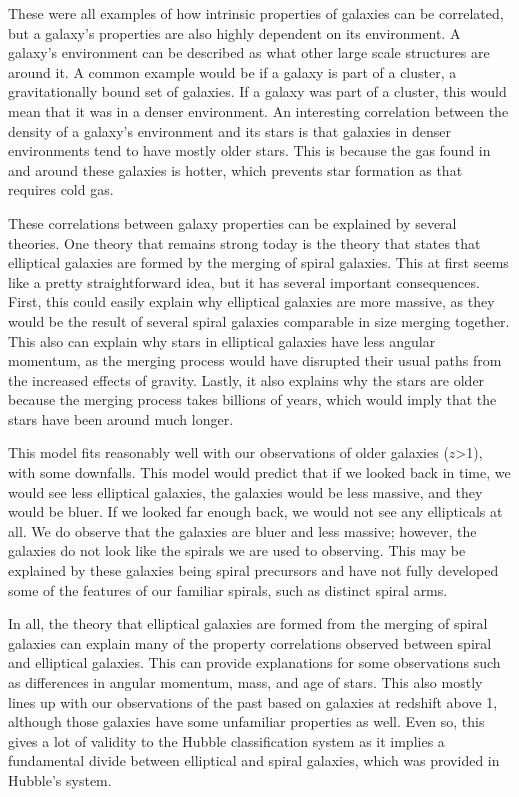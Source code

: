 \documentclass[12pt]{article}
\begin{document}
These were all examples of how intrinsic properties of galaxies can be
correlated, but a galaxy's properties are also highly dependent on its
environment.  A galaxy's environment can be described as what other large scale
structures are around it.  A common example would be if a galaxy is part of a
cluster, a gravitationally bound set of galaxies.  If a galaxy was part of a
cluster, this would mean that it was in a denser environment.  An interesting
correlation between the density of a galaxy's environment and its stars is that
galaxies in denser environments tend to have mostly older stars.  This is
because the gas found in and around these galaxies is hotter, which prevents
star formation as that requires cold gas.

These correlations between galaxy properties can be explained by several
theories.  One theory that remains strong today is the theory that states that
elliptical galaxies are formed by the merging of spiral galaxies.  This at first
seems like a pretty straightforward idea, but it has several important
consequences.  First, this could easily explain why elliptical galaxies are more
massive, as they would be the result of several spiral galaxies comparable in
size merging together.  This also can explain why stars in elliptical galaxies
have less angular momentum, as the merging process would have disrupted their
usual paths from the increased effects of gravity.  Lastly, it also explains why
the stars are older because the merging process takes billions of years, which
would imply that the stars have been around much longer.

This model fits reasonably well with our observations of older galaxies ($z$>1),
with some downfalls. This model would predict that if we looked back in time, we
would see less elliptical galaxies, the galaxies would be less massive, and they
would be bluer.  If we looked far enough back, we would not see any ellipticals
at all.  We do observe that the galaxies are bluer and less massive; however,
the galaxies do not look like the spirals we are used to observing.  This may be
explained by these galaxies being spiral precursors and have not fully developed
some of the features of our familiar spirals, such as distinct spiral arms.

In all, the theory that elliptical galaxies are formed from the merging of
spiral galaxies can explain many of the property correlations observed between
spiral and elliptical galaxies.  This can provide explanations for some
observations such as differences in angular momentum, mass, and age of stars.
This also mostly lines up with our observations of the past based on galaxies at
redshift above 1, although those galaxies have some unfamiliar properties as
well. Even so, this gives a lot of validity to the Hubble classification system
as it implies a fundamental divide between elliptical and spiral galaxies, which
was provided in Hubble's system.
\end{document}
